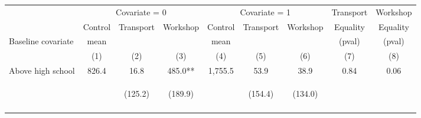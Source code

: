\begin{tabular}{lcccccccc}
\hline \noalign{\smallskip} & \multicolumn{3}{c}{Covariate = 0} & \multicolumn{3}{c}{Covariate = 1} & Transport & Workshop\\
\cmidrule(lr){2-4}\cmidrule(lr){5-7}\cmidrule(lr){8-9} & Control & {Transport} & {Workshop} & Control & {Transport} & {Workshop} & {Equality} & {Equality}\\
Baseline covariate & mean &  &  & mean &  &  & (pval) & (pval)\\
 & (1) & (2) & (3) & (4) & (5) & (6) & (7) & (8)\\
\noalign{\smallskip}\hline \noalign{\smallskip}Above high school & 826.4 & 16.8 & 485.0** & 1,755.5 & 53.9 & 38.9 & 0.84 & 0.06\\
 & \begin{footnotesize}\end{footnotesize} & \begin{footnotesize}(125.2)\end{footnotesize} & \begin{footnotesize}(189.9)\end{footnotesize} & \begin{footnotesize}\end{footnotesize} & \begin{footnotesize}(154.4)\end{footnotesize} & \begin{footnotesize}(134.0)\end{footnotesize} & \begin{footnotesize}\end{footnotesize} & \begin{footnotesize}\end{footnotesize}\\
 & \begin{footnotesize}\end{footnotesize} & \begin{footnotesize}[1.000]\end{footnotesize} & \begin{footnotesize}[0.030]\end{footnotesize} & \begin{footnotesize}\end{footnotesize} & \begin{footnotesize}[1.000]\end{footnotesize} & \begin{footnotesize}[0.863]\end{footnotesize} & \begin{footnotesize}\end{footnotesize} & \begin{footnotesize}\end{footnotesize}\\

\end{tabular}
